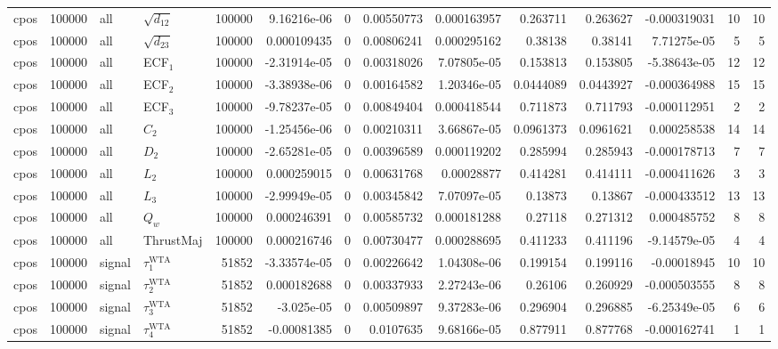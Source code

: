 \begin{landscape}
\begin{longtable}{llll r rrrr rr r rr}
cpos & 100000 & all & $\sqrt{d_{12}}$ & 100000 & 9.16216e-06 & 0 & 0.00550773 & 0.000163957 & 0.263711 & 0.263627 & -0.000319031 & 10 & 10 \\
cpos & 100000 & all & $\sqrt{d_{23}}$ & 100000 & 0.000109435 & 0 & 0.00806241 & 0.000295162 & 0.38138 & 0.38141 & 7.71275e-05 & 5 & 5 \\
cpos & 100000 & all & ECF$_1$ & 100000 & -2.31914e-05 & 0 & 0.00318026 & 7.07805e-05 & 0.153813 & 0.153805 & -5.38643e-05 & 12 & 12 \\
cpos & 100000 & all & ECF$_2$ & 100000 & -3.38938e-06 & 0 & 0.00164582 & 1.20346e-05 & 0.0444089 & 0.0443927 & -0.000364988 & 15 & 15 \\
cpos & 100000 & all & ECF$_3$ & 100000 & -9.78237e-05 & 0 & 0.00849404 & 0.000418544 & 0.711873 & 0.711793 & -0.000112951 & 2 & 2 \\
cpos & 100000 & all & $C_2$ & 100000 & -1.25456e-06 & 0 & 0.00210311 & 3.66867e-05 & 0.0961373 & 0.0961621 & 0.000258538 & 14 & 14 \\
cpos & 100000 & all & $D_2$ & 100000 & -2.65281e-05 & 0 & 0.00396589 & 0.000119202 & 0.285994 & 0.285943 & -0.000178713 & 7 & 7 \\
cpos & 100000 & all & $L_2$ & 100000 & 0.000259015 & 0 & 0.00631768 & 0.00028877 & 0.414281 & 0.414111 & -0.000411626 & 3 & 3 \\
cpos & 100000 & all & $L_3$ & 100000 & -2.99949e-05 & 0 & 0.00345842 & 7.07097e-05 & 0.13873 & 0.13867 & -0.000433512 & 13 & 13 \\
cpos & 100000 & all & $Q_w$ & 100000 & 0.000246391 & 0 & 0.00585732 & 0.000181288 & 0.27118 & 0.271312 & 0.000485752 & 8 & 8 \\
cpos & 100000 & all & ThrustMaj & 100000 & 0.000216746 & 0 & 0.00730477 & 0.000288695 & 0.411233 & 0.411196 & -9.14579e-05 & 4 & 4 \\
cpos & 100000 & signal & $\tau_1^{\mathrm{WTA}}$ & 51852 & -3.33574e-05 & 0 & 0.00226642 & 1.04308e-06 & 0.199154 & 0.199116 & -0.00018945 & 10 & 10 \\
cpos & 100000 & signal & $\tau_2^{\mathrm{WTA}}$ & 51852 & 0.000182688 & 0 & 0.00337933 & 2.27243e-06 & 0.26106 & 0.260929 & -0.000503555 & 8 & 8 \\
cpos & 100000 & signal & $\tau_3^{\mathrm{WTA}}$ & 51852 & -3.025e-05 & 0 & 0.00509897 & 9.37283e-06 & 0.296904 & 0.296885 & -6.25349e-05 & 6 & 6 \\
cpos & 100000 & signal & $\tau_4^{\mathrm{WTA}}$ & 51852 & -0.00081385 & 0 & 0.0107635 & 9.68166e-05 & 0.877911 & 0.877768 & -0.000162741 & 1 & 1 \\

\end{longtable}
\end{landscape}
